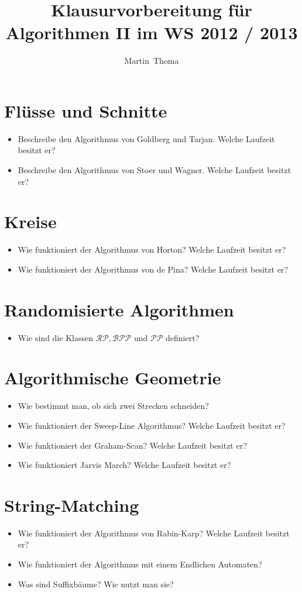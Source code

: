 \documentclass[a4paper,12pt]{article}
\newcommand{\Nachname}{Thoma}
\newcommand{\Vorname}{Martin}
\newcommand{\Titel}{Klausurvorbereitung für Algorithmen II im WS 2012 / 2013}
\begin{document}
\title{\Titel}
\author{\Vorname~\Nachname}

\section{Flüsse und Schnitte}
\begin{itemize}
    \item Beschreibe den Algorithmus von Goldberg und Tarjan. Welche Laufzeit besitzt er?
    \item Beschreibe den Algorithmus von Stoer und Wagner. Welche Laufzeit besitzt er?
\end{itemize}

\section{Kreise}
\begin{itemize}
    \item Wie funktioniert der Algorithmus von Horton?  Welche Laufzeit besitzt er?
    \item Wie funktioniert der Algorithmus von de Pina? Welche Laufzeit besitzt er?
\end{itemize}

\section{Randomisierte Algorithmen}
\begin{itemize}
    \item Wie sind die Klassen $\mathcal{RP}, \mathcal{BPP}$ und 
          $\mathcal{PP}$ definiert?
\end{itemize}

\section{Algorithmische Geometrie}
\begin{itemize}
    \item Wie bestimmt man, ob sich zwei Strecken schneiden?
    \item Wie funktioniert der Sweep-Line Algorithmus? Welche Laufzeit besitzt er?
    \item Wie funktioniert der Graham-Scan? Welche Laufzeit besitzt er?
    \item Wie funktioniert Jarvis March? Welche Laufzeit besitzt er?
\end{itemize}

\section{String-Matching}
\begin{itemize}
    \item Wie funktioniert der Algorithmus von Rabin-Karp? Welche Laufzeit besitzt er?
    \item Wie funktioniert der Algorithmus mit einem Endlichen Automaten?
    \item Was sind Suffixbäume? Wie nutzt man sie?
\end{itemize}
\end{document}
